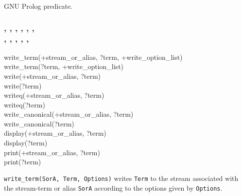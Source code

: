 \begin{PlErrors}



\end{PlErrors}

\Portability

GNU Prolog predicate.

\subsubsection{,\label{write-term/3}
               ,
               ,
               ,
               ,
               , \\
               ,
               ,
               ,
               ,
               , \\
               }


\begin{TemplatesOneCol}
write\_term(+stream\_or\_alias, ?term, +write\_option\_list)\\
write\_term(?term, +write\_option\_list)\\
write(+stream\_or\_alias, ?term)\\
write(?term)\\
writeq(+stream\_or\_alias, ?term)\\
writeq(?term)\\
write\_canonical(+stream\_or\_alias, ?term)\\
write\_canonical(?term)\\
display(+stream\_or\_alias, ?term)\\
display(?term)\\
print(+stream\_or\_alias, ?term)\\
print(?term)

\end{TemplatesOneCol}

\Description

\texttt{write\_term(SorA, Term, Options)} writes
\texttt{Term} to the stream associated with the stream-term or alias
\texttt{SorA} according to the options given by \texttt{Options}.

